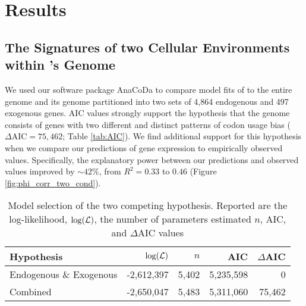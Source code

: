 
\section{Results}
\subsection{The Signatures of two Cellular Environments within \kluyveri's Genome}
We used our software package AnaCoDa \citep{landerer2018} to compare model fits of \ROC to the entire \kluyveri genome and its genome partitioned into two sets of 4,864 endogenous and 497 exogenous genes.
AIC values strongly support the hypothesis that the \kluyveri genome consists of genes with two different and distinct patterns of codon usage bias ($\Delta\text{AIC} = 75,462$; Table \ref{tab:AIC}).
We find additional support for this hypothesis when we compare our predictions of gene expression to empirically observed values.
Specifically, the explanatory power between our predictions and observed values improved by $\sim 42\%$, from $R^2 = 0.33$ to $0.46$ (Figure \ref{fig:phi_corr_two_cond}).

\begin{table}[h]
  \centering
  \caption{Model selection of the two competing hypothesis. Reported are the log-likelihood, $\log(\mathcal{L})$, the number of parameters estimated $n$, AIC, and $\Delta$AIC values}
  \begin{tabular}{lrrrr}
    \hline
    Hypothesis             & $\log(\mathcal{L})$ &$n$ &  AIC & $\Delta$AIC\\ \hline 
    Endogenous \& Exogenous& -2,612,397 & 5,402 & 5,235,598&      0\\
    Combined               & -2,650,047 & 5,483 & 5,311,060& 75,462\\ \hline
  \end{tabular}
  \label{tab:AIC_klu}
\end{table}
\clearpage


